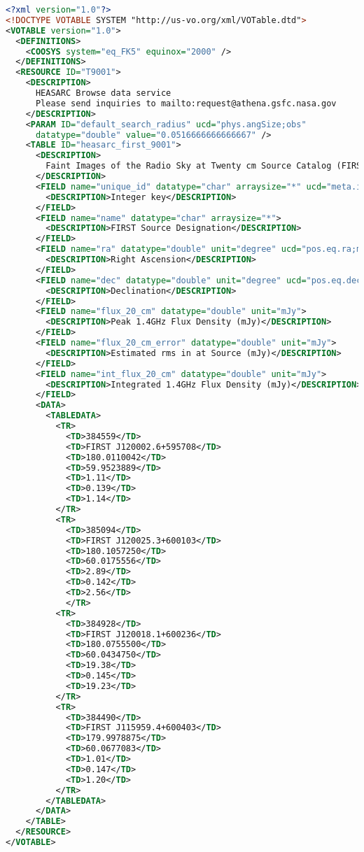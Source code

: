 \documentclass[11pt,a4paper]{ivoa}
\begin{document}
\begin{lstlisting}[language=XML,basicstyle=\footnotesize] 
<?xml version="1.0"?>
<!DOCTYPE VOTABLE SYSTEM "http://us-vo.org/xml/VOTable.dtd">
<VOTABLE version="1.0">
  <DEFINITIONS>
    <COOSYS system="eq_FK5" equinox="2000" />
  </DEFINITIONS>
  <RESOURCE ID="T9001">
    <DESCRIPTION>
      HEASARC Browse data service
      Please send inquiries to mailto:request@athena.gsfc.nasa.gov
    </DESCRIPTION>
    <PARAM ID="default_search_radius" ucd="phys.angSize;obs" 
      datatype="double" value="0.0516666666666667" />
    <TABLE ID="heasarc_first_9001">
      <DESCRIPTION>
        Faint Images of the Radio Sky at Twenty cm Source Catalog (FIRST)
      </DESCRIPTION>
      <FIELD name="unique_id" datatype="char" arraysize="*" ucd="meta.id;meta.main">
        <DESCRIPTION>Integer key</DESCRIPTION>
      </FIELD>
      <FIELD name="name" datatype="char" arraysize="*">
        <DESCRIPTION>FIRST Source Designation</DESCRIPTION>
      </FIELD>
      <FIELD name="ra" datatype="double" unit="degree" ucd="pos.eq.ra;meta.main">
        <DESCRIPTION>Right Ascension</DESCRIPTION>
      </FIELD>
      <FIELD name="dec" datatype="double" unit="degree" ucd="pos.eq.dec;meta.main">
        <DESCRIPTION>Declination</DESCRIPTION>
      </FIELD>
      <FIELD name="flux_20_cm" datatype="double" unit="mJy">
        <DESCRIPTION>Peak 1.4GHz Flux Density (mJy)</DESCRIPTION>
      </FIELD>
      <FIELD name="flux_20_cm_error" datatype="double" unit="mJy">
        <DESCRIPTION>Estimated rms in at Source (mJy)</DESCRIPTION>
      </FIELD>
      <FIELD name="int_flux_20_cm" datatype="double" unit="mJy">
        <DESCRIPTION>Integrated 1.4GHz Flux Density (mJy)</DESCRIPTION>
      </FIELD>
      <DATA>
        <TABLEDATA>
          <TR>
            <TD>384559</TD>
            <TD>FIRST J120002.6+595708</TD>
            <TD>180.0110042</TD>
            <TD>59.9523889</TD>
            <TD>1.11</TD>
            <TD>0.139</TD>
            <TD>1.14</TD>
          </TR>
          <TR>
            <TD>385094</TD>
            <TD>FIRST J120025.3+600103</TD>
            <TD>180.1057250</TD>
            <TD>60.0175556</TD>
            <TD>2.89</TD>
            <TD>0.142</TD>
            <TD>2.56</TD>
            </TR>
          <TR>
            <TD>384928</TD>
            <TD>FIRST J120018.1+600236</TD>
            <TD>180.0755500</TD>
            <TD>60.0434750</TD>
            <TD>19.38</TD>
            <TD>0.145</TD>
            <TD>19.23</TD>
          </TR>
          <TR>
            <TD>384490</TD>
            <TD>FIRST J115959.4+600403</TD>
            <TD>179.9978875</TD>
            <TD>60.0677083</TD>
            <TD>1.01</TD>
            <TD>0.147</TD>
            <TD>1.20</TD>
          </TR>
        </TABLEDATA>
      </DATA>
    </TABLE>
  </RESOURCE>
</VOTABLE>
\end{lstlisting}
\end{document}
